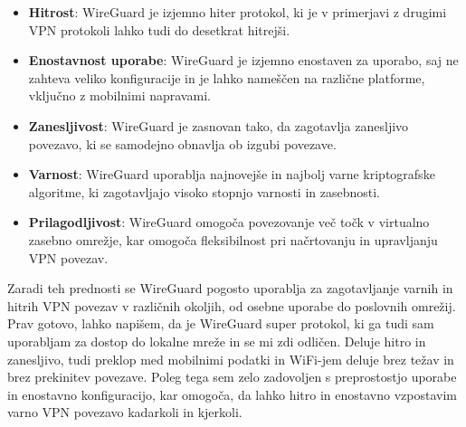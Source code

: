 \documentclass[a4paper, 11pt]{article}
\begin{document}
\begin{itemize}
    \item \textbf{Hitrost}: WireGuard je izjemno hiter protokol, ki je v primerjavi z drugimi VPN protokoli lahko tudi do desetkrat hitrejši.
    \item \textbf{Enostavnost uporabe}: WireGuard je izjemno enostaven za uporabo, saj ne zahteva veliko konfiguracije in je lahko nameščen na različne platforme, vključno z mobilnimi napravami.
    \item \textbf{Zanesljivost}: WireGuard je zasnovan tako, da zagotavlja zanesljivo povezavo, ki se samodejno obnavlja ob izgubi povezave.
    \item \textbf{Varnost}: WireGuard uporablja najnovejše in najbolj varne kriptografske algoritme, ki zagotavljajo visoko stopnjo varnosti in zasebnosti.
    \item \textbf{Prilagodljivost}: WireGuard omogoča povezovanje več točk v virtualno zasebno omrežje, kar omogoča fleksibilnost pri načrtovanju in upravljanju VPN povezav.
\end{itemize}

Zaradi teh prednosti se WireGuard pogosto uporablja za zagotavljanje varnih in hitrih VPN povezav v različnih okoljih, od osebne uporabe do poslovnih omrežij.
Prav gotovo, lahko napišem, da je WireGuard super protokol, ki ga tudi sam uporabljam za dostop do lokalne mreže in se mi zdi odličen. 
Deluje hitro in zanesljivo, tudi preklop med mobilnimi podatki in WiFi-jem deluje brez težav in brez prekinitev povezave. 
Poleg tega sem zelo zadovoljen s preprostostjo uporabe in enostavno konfiguracijo, kar omogoča, da lahko hitro in enostavno vzpostavim varno VPN povezavo 
kadarkoli in kjerkoli.



\end{document}
